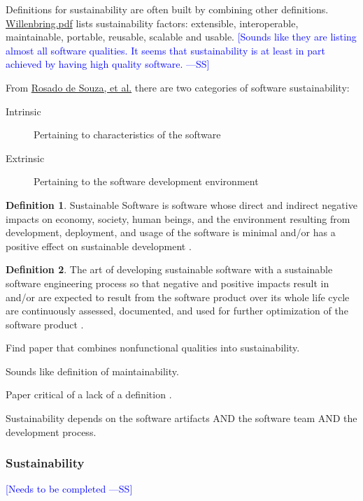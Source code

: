 \documentclass[letterpaper, cleveref]{lipics-v2019}
\newcommand{\authornote}[3]{\textcolor{#1}{[#3 ---#2]}}
\newcommand{\authornote}[3]{}
\newcommand{\wss}[1]{\authornote{blue}{SS}{#1}} %
\theoremstyle{definition}
\newtheorem{defn}{Definition}
\begin{document}
Definitions for sustainability are often built by combining other definitions.
\href{https://collegeville.github.io/CW3S19/WorkshopResources/Presentations/1-4-2019CollegevilleWorkshopWillenbring.pdf}
{Willenbring.pdf}
lists sustainability factors: extensible, interoperable, maintainable,
portable, reusable, scalable and usable.  \wss{Sounds like they are listing
almost all software qualities.  It seems that sustainability is at least in
part achieved by having high quality software.}

From
\href{https://figshare.com/articles/Defining_Sustainability_through_Developers_Eyes_Recommendations_from_an_Interview_Study/1111925/1}
{Rosado de Souza, et al.} there are two categories of software sustainability:

\begin{description}
\item[Intrinsic] Pertaining to characteristics of the software
\item[Extrinsic] Pertaining to the software development environment
\end{description}

\begin{defn}
Sustainable Software is software whose direct and indirect negative impacts on economy, society, human beings, and the environment resulting from development, deployment, and usage of the software is minimal and/or has a positive effect on sustainable development \citep{dick2010model}.
\end{defn}

\begin{defn}
The art of developing sustainable software with a sustainable software engineering process so that negative and positive impacts result in and/or are expected to result from the software product over its whole life cycle are continuously assessed, documented, and used for further optimization of the software product \citep{venters2014software}.
\end{defn}


Find paper that combines nonfunctional qualities into sustainability.

Sounds like definition of maintainability.

Paper critical of a lack of a definition \citep{VentersEtAl2014}.

Sustainability depends on the software artifacts AND the software team AND the
development process.

\begin{mybox}
\subsubsection*{Sustainability} 
\wss{Needs to be completed}
\end{mybox}
\end{document}
